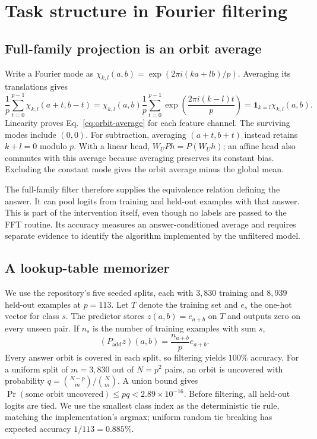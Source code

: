 \section{Task structure in Fourier filtering}
\label{app:fourier-control}

\subsection{Full-family projection is an orbit average}

Write a Fourier mode as $\chi_{k,l}(a,b)=\exp(2\pi i(ka+lb)/p)$. Averaging its translations gives
\begin{equation}
\frac{1}{p}\sum_{t=0}^{p-1}\chi_{k,l}(a+t,b-t)
=\chi_{k,l}(a,b)\frac{1}{p}\sum_{t=0}^{p-1}\exp\!\left(\frac{2\pi i(k-l)t}{p}\right)
=\mathbf{1}_{k=l}\chi_{k,l}(a,b).
\end{equation}
Linearity proves Eq.~\ref{eq:orbit-average} for each feature channel. The surviving modes include $(0,0)$. For subtraction, averaging $(a+t,b+t)$ instead retains $k+l=0$ modulo $p$. With a linear head, $W_U P h=P(W_U h)$; an affine head also commutes with this average because averaging preserves its constant bias. Excluding the constant mode gives the orbit average minus the global mean.

The full-family filter therefore supplies the equivalence relation defining the answer. It can pool logits from training and held-out examples with that answer. This is part of the intervention itself, even though no labels are passed to the FFT routine. Its accuracy measures an answer-conditioned average and requires separate evidence to identify the algorithm implemented by the unfiltered model.

\subsection{A lookup-table memorizer}

We use the repository's five seeded splits, each with $3{,}830$ training and $8{,}939$ held-out examples at $p=113$. Let $T$ denote the training set and $e_s$ the one-hot vector for class $s$. The predictor stores $z(a,b)=e_{a+b}$ on $T$ and outputs zero on every unseen pair. If $n_s$ is the number of training examples with sum $s$,
\begin{equation}
(P_{\mathrm{add}}z)(a,b)=\frac{n_{a+b}}{p}e_{a+b}.
\end{equation}
Every answer orbit is covered in each split, so filtering yields $100\%$ accuracy. For a uniform split of $m=3{,}830$ out of $N=p^2$ pairs, an orbit is uncovered with probability $q=\binom{N-p}{m}/\binom{N}{m}$. A union bound gives $\Pr(\text{some orbit uncovered})\leq pq<2.89\times10^{-16}$. Before filtering, all held-out logits are tied. We use the smallest class index as the deterministic tie rule, matching the implementation's argmax; uniform random tie breaking has expected accuracy $1/113=0.885\%$.

